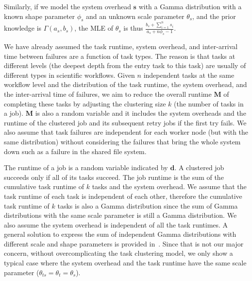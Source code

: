 \documentclass{IOS-Book-Article}
\begin{document}
Similarly, if we model the system overhead $\bm s$ with a Gamma distribution with a known shape parameter $\phi_{s}$ and an unknown scale parameter $\theta_s$, and the prior knowledge is $\Gamma(a_s, b_s)$, the MLE of $\theta_s$ is thus $\displaystyle\frac{b_s+\displaystyle\sum_{i=1}^n{s_i}}{a_s+n\phi_s-1}$.

We have already assumed the task runtime, system overhead, and inter-arrival time between failures are a function of task types. The reason is that tasks at different levels (the deepest depth from the entry task to this task) are usually of different types in scientific workflows. Given $n$ independent tasks at the same workflow level and the distribution of the task runtime, the system overhead, and the inter-arrival time of failures, we aim to reduce the overall runtime $\bm M$ of completing these tasks by adjusting the clustering size $k$ (the number of tasks in a job). 
$\bm M$ is also a random variable and it includes the system overheads and the runtime of the clustered job and its subsequent retry jobs if the first try fails. We also assume that task failures are independent for each worker node (but with the same distribution) without considering the failures that bring the whole system down such as a failure in the shared file system. 

The runtime of a job is a random variable indicated by $\bm d$. A clustered job succeeds only if all of its tasks succeed. The job runtime is the sum of the cumulative task runtime of $k$ tasks and the system overhead. We assume that the task runtime of each task is independent of each other, therefore the cumulative task runtime of $k$ tasks is also a Gamma distribution since the sum of Gamma distributions with the same scale parameter is still a Gamma distribution. We also assume the system overhead is independent of all the task runtimes. A general solution to express the sum of independent Gamma distributions with different scale and shape parameters is provided in~\cite{nadarajah2008review}. Since that is not our major concern, without overcomplicating the task clustering model, we only show a typical case where the system overhead and the task runtime have the same scale parameter ($\theta_{ts}=\theta_{t}=\theta_{s}$). 
\end{document}
